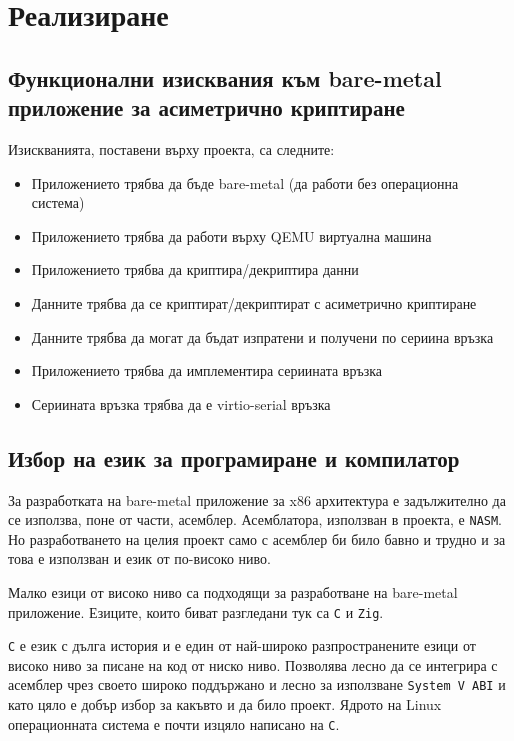 \chapter{Реализиране} %
\section{Функционални изисквания към bare-metal приложение за асиметрично криптиране}
Изискванията, поставени върху проекта, са следните:
\begin{itemize}
  \item Приложението трябва да бъде bare-metal (да работи без операционна система)
  \item Приложението трябва да работи върху QEMU виртуална машина
  \item Приложението трябва да криптира/декриптира данни
  \item Данните трябва да се криптират/декриптират с асиметрично криптиране
  \item Данните трябва да могат да бъдат изпратени и получени по сериина връзка
  \item Приложението трябва да имплементира сериината връзка
  \item Сериината връзка трябва да е virtio-serial връзка
\end{itemize}

\section{Избор на език за програмиране и компилатор}
За разработката на bare-metal приложение за x86 архитектура е задължително да се използва, поне от части, асемблер. Асемблатора, използван в проекта, е {\tt NASM}. Но разработването на целия проект само с асемблер би било бавно и трудно и за това е използван и език от по-високо ниво.

Малко езици от високо ниво са подходящи за разработване на bare-metal приложение. Езиците, които биват разгледани тук са {\tt C} и {\tt Zig}.

{\tt C} е език с дълга история и е един от най-широко разпространените езици от високо ниво за писане на код от ниско ниво. Позволява лесно да се интегрира с асемблер чрез своето широко поддържано и лесно за използване {\tt System V ABI}\cite{sysvabi} и като цяло е добър избор за какъвто и да било проект. Ядрото на Linux операционната система е почти изцяло написано на {\tt C}.\cite{linux-source}

